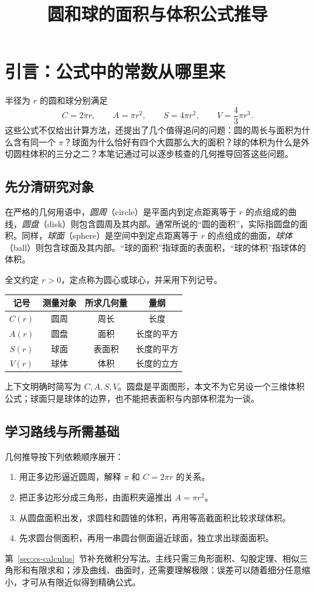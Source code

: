 \documentclass[UTF8,12pt,a4paper,fontset=fandol]{ctexart}
\title{圆和球的面积与体积公式推导}
\author{}
\date{}
\begin{document}
\maketitle
\tableofcontents

\section{引言：公式中的常数从哪里来}
\label{sec:cs-introduction}

半径为 $r$ 的圆和球分别满足
\[
  C=2\pi r,\qquad A=\pi r^2,\qquad
  S=4\pi r^2,\qquad V=\frac43\pi r^3.
\]
这些公式不仅给出计算方法，还提出了几个值得追问的问题：圆的周长与面积为什么含有同一个 $\pi$？球面为什么恰好有四个大圆那么大的面积？球的体积为什么是外切圆柱体积的三分之二？本笔记通过可以逐步核查的几何推导回答这些问题。

\subsection{先分清研究对象}

在严格的几何用语中，\emph{圆周}（circle）是平面内到定点距离等于 $r$ 的点组成的曲线，\emph{圆盘}（disk）则包含圆周及其内部。通常所说的“圆的面积”，实际指圆盘的面积。同样，\emph{球面}（sphere）是空间中到定点距离等于 $r$ 的点组成的曲面，\emph{球体}（ball）则包含球面及其内部。“球的面积”指球面的表面积，“球的体积”指球体的体积。

全文约定 $r>0$，定点称为圆心或球心，并采用下列记号。
\begin{center}
\begin{tabular}{c c c c}
\toprule
记号 & 测量对象 & 所求几何量 & 量纲 \\
\midrule
$C(r)$ & 圆周 & 周长 & 长度 \\
$A(r)$ & 圆盘 & 面积 & 长度的平方 \\
$S(r)$ & 球面 & 表面积 & 长度的平方 \\
$V(r)$ & 球体 & 体积 & 长度的立方 \\
\bottomrule
\end{tabular}
\end{center}
上下文明确时简写为 $C,A,S,V$。圆盘是平面图形，本文不为它另设一个三维体积公式；球面只是球体的边界，也不能把表面积与内部体积混为一谈。

\subsection{学习路线与所需基础}

几何推导按下列依赖顺序展开：
\begin{enumerate}
  \item 用正多边形逼近圆周，解释 $\pi$ 和 $C=2\pi r$ 的关系。
  \item 把正多边形分成三角形，由面积夹逼推出 $A=\pi r^2$。
  \item 从圆盘面积出发，求圆柱和圆锥的体积，再用等高截面积比较求球体积。
  \item 先求圆台侧面积，再用一串圆台侧面逼近球面，独立求出球面面积。
\end{enumerate}
第~\ref{sec:cs-calculus}~节补充微积分写法。主线只需三角形面积、勾股定理、相似三角形和有限求和；涉及曲线、曲面时，还需要理解极限：误差可以随着细分任意缩小，才可从有限近似得到精确公式。
\end{document}
